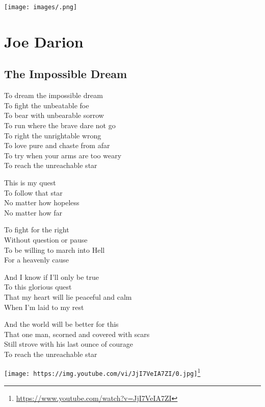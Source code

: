 \documentclass[
]{book}
\renewenvironment{quote}{\begin{VF}}{\end{VF}}
\renewcommand{\href}[2]{#2\footnote{\url{#1}}}
\begin{document}
\texttt{[image: images/.png]}

\hypertarget{joe-darion}{%
\chapter{Joe Darion}\label{joe-darion}}

\hypertarget{the-impossible-dream}{%
\section{The Impossible Dream}\label{the-impossible-dream}}

\begin{quote}
To dream the impossible dream\\
To fight the unbeatable foe\\
To bear with unbearable sorrow\\
To run where the brave dare not go\\
To right the unrightable wrong\\
To love pure and chaste from afar\\
To try when your arms are too weary\\
To reach the unreachable star

This is my quest\\
To follow that star\\
No matter how hopeless\\
No matter how far

To fight for the right\\
Without question or pause\\
To be willing to march into Hell\\
For a heavenly cause

And I know if I'll only be true\\
To this glorious quest\\
That my heart will lie peaceful and calm\\
When I'm laid to my rest

And the world will be better for this\\
That one man, scorned and covered with scars\\
Still strove with his last ounce of courage\\
To reach the unreachable star
\end{quote}

\href{https://www.youtube.com/watch?v=JjI7VeIA7ZI}{\texttt{[image: https://img.youtube.com/vi/JjI7VeIA7ZI/0.jpg]}}
\end{document}
